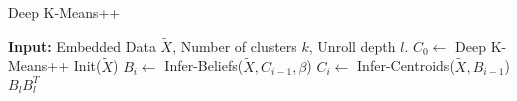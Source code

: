 \begin{algorithm}[H]
\caption{Deep K-Means++}
\begin{algorithmic}[1]
	\State \textbf{Input:} Embedded Data $\widetilde{X}$, Number of clusters $k$, Unroll depth $l$. 
    \State $C_0 \gets $ Deep K-Means++ Init($\widetilde{X}$) 
    \State $B_i \gets $ Infer-Beliefs($\widetilde{X},C_{i-1},\beta$)
    \State $C_i \gets $ Infer-Centroids($\widetilde{X},B_{i-1}$)
    \EndFor
    \State \Return $B_{l} B_{l}^{T}$
\end{algorithmic}
\end{algorithm}